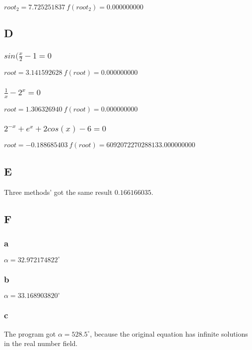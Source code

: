 \documentclass[12]{article}%
\begin{document}
            $root_2=7.725251837 \ f(root_2)=0.000000000$
        \subsection{D}
            \subsubsection{$sin(\frac{x}{2}-1=0$}
                $root=3.141592628\ f(root)=0.000000000$
            \subsubsection{$\frac{1}{x}-2^x=0$}
                $root=1.306326940\ f(root)=0.000000000$
            \subsubsection{$2^{-x}+e^x+2cos(x)-6=0$}
                $root=-0.188685403\ f(root)=6092072270288133.000000000$
        \subsection{E}
            Three methods' got the same result $0.166166035$. 
        \subsection{F}
            \subsubsection{a}
                 $\alpha=32.972174822^\circ$
            \subsubsection{b}
                 $\alpha=33.168903820^\circ$
            \subsubsection{c}
                The program got $\alpha=528.5^\circ$, because the original equation has infinite solutions in the real number field.
\end{document}
